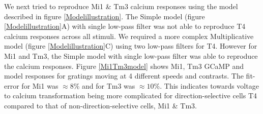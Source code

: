 \documentclass[9pt,lineno]{elife}
\begin{document}
We next tried to reproduce Mi1 \& Tm3 calcium responses using the model described in figure \ref{Modelillustration}. The Simple model (figure \ref{Modelillustration}A) with single low-pass filter was not able to reproduce T4 calcium responses across all stimuli. We required a more complex Multiplicative model (figure \ref{Modelillustration}C) using two low-pass filters for T4. However for Mi1 and Tm3, the Simple model with single low-pass filter was able to reproduce the calcium responses. Figure \ref{Mi1Tm3model} shows Mi1, Tm3 GCaMP and model responses for gratings moving at 4 different speeds and contrasts. The fit-error for Mi1 was $\approx8\%$ and for Tm3 was $\approx10\%$. This indicates towards voltage to calcium transformation being more complicated for direction-selective cells T4 compared to that of non-direction-selective cells, Mi1 \& Tm3.
\end{document}
